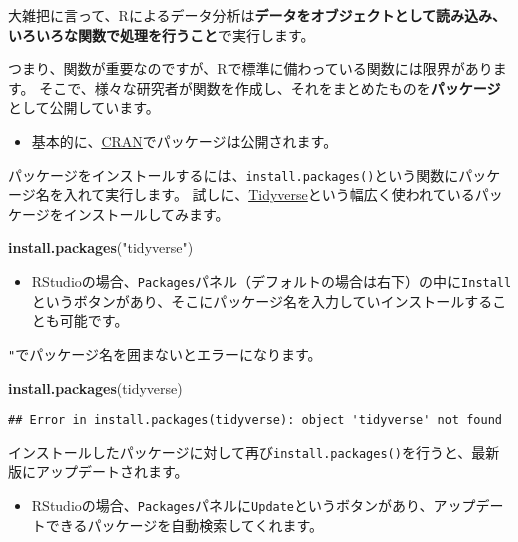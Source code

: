 \documentclass[]{bxjsarticle}
\newenvironment{Shaded}{\begin{snugshade}}{\end{snugshade}}
\newcommand{\KeywordTok}[1]{\textcolor[rgb]{0.13,0.29,0.53}{\textbf{#1}}}
\newcommand{\NormalTok}[1]{#1}
\newcommand{\StringTok}[1]{\textcolor[rgb]{0.31,0.60,0.02}{#1}}
\providecommand{\tightlist}{%
  \setlength{\itemsep}{0pt}\setlength{\parskip}{0pt}}
\begin{document}
大雑把に言って、Rによるデータ分析は\textbf{データをオブジェクトとして読み込み、いろいろな関数で処理を行うこと}で実行します。

つまり、関数が重要なのですが、Rで標準に備わっている関数には限界があります。
そこで、様々な研究者が関数を作成し、それをまとめたものを\textbf{パッケージ}として公開しています。

\begin{itemize}
\tightlist
\item
  基本的に、\href{https://cran.r-project.org/}{CRAN}でパッケージは公開されます。
\end{itemize}

パッケージをインストールするには、\texttt{install.packages()}という関数にパッケージ名を入れて実行します。
試しに、\href{https://www.tidyverse.org/}{Tidyverse}という幅広く使われているパッケージをインストールしてみます。

\begin{Shaded}
\begin{Highlighting}[]
\KeywordTok{install.packages}\NormalTok{(}\StringTok{"tidyverse"}\NormalTok{)}
\end{Highlighting}
\end{Shaded}

\begin{itemize}
\tightlist
\item
  RStudioの場合、\texttt{Packages}パネル（デフォルトの場合は右下）の中に\texttt{Install}というボタンがあり、そこにパッケージ名を入力していインストールすることも可能です。
\end{itemize}

\texttt{"}でパッケージ名を囲まないとエラーになります。

\begin{Shaded}
\begin{Highlighting}[]
\KeywordTok{install.packages}\NormalTok{(tidyverse)}
\end{Highlighting}
\end{Shaded}

\begin{verbatim}
## Error in install.packages(tidyverse): object 'tidyverse' not found
\end{verbatim}

インストールしたパッケージに対して再び\texttt{install.packages()}を行うと、最新版にアップデートされます。

\begin{itemize}
\tightlist
\item
  RStudioの場合、\texttt{Packages}パネルに\texttt{Update}というボタンがあり、アップデートできるパッケージを自動検索してくれます。
\end{itemize}
\end{document}

